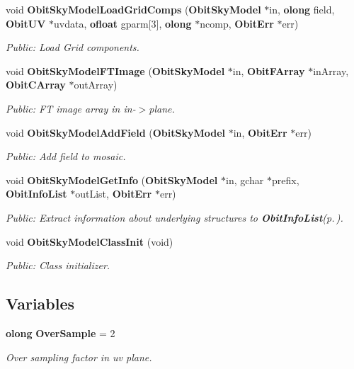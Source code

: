 \begin{CompactItemize}
void {\bf Obit\-Sky\-Model\-Load\-Grid\-Comps} ({\bf Obit\-Sky\-Model} $\ast$in, {\bf olong} field, {\bf Obit\-UV} $\ast$uvdata, {\bf ofloat} gparm[3], {\bf olong} $\ast$ncomp, {\bf Obit\-Err} $\ast$err)
\begin{CompactList}\small\item\em Public: Load Grid components. \item\end{CompactList}\item 
void {\bf Obit\-Sky\-Model\-FTImage} ({\bf Obit\-Sky\-Model} $\ast$in, {\bf Obit\-FArray} $\ast$in\-Array, {\bf Obit\-CArray} $\ast$out\-Array)
\begin{CompactList}\small\item\em Public: FT image array in in-$>$plane. \item\end{CompactList}\item 
void {\bf Obit\-Sky\-Model\-Add\-Field} ({\bf Obit\-Sky\-Model} $\ast$in, {\bf Obit\-Err} $\ast$err)
\begin{CompactList}\small\item\em Public: Add field to mosaic. \item\end{CompactList}\item 
void {\bf Obit\-Sky\-Model\-Get\-Info} ({\bf Obit\-Sky\-Model} $\ast$in, gchar $\ast$prefix, {\bf Obit\-Info\-List} $\ast$out\-List, {\bf Obit\-Err} $\ast$err)
\begin{CompactList}\small\item\em Public: Extract information about underlying structures to {\bf Obit\-Info\-List}{\rm (p.\,\pageref{structObitInfoList})}. \item\end{CompactList}\item 
void {\bf Obit\-Sky\-Model\-Class\-Init} (void)
\begin{CompactList}\small\item\em Public: Class initializer. \item\end{CompactList}\end{CompactItemize}
\subsection*{Variables}
\begin{CompactItemize}
\item 
{\bf olong} {\bf Over\-Sample} = 2
\begin{CompactList}\small\item\em Over sampling factor in uv plane. \item\end{CompactList}\end{CompactItemize}


